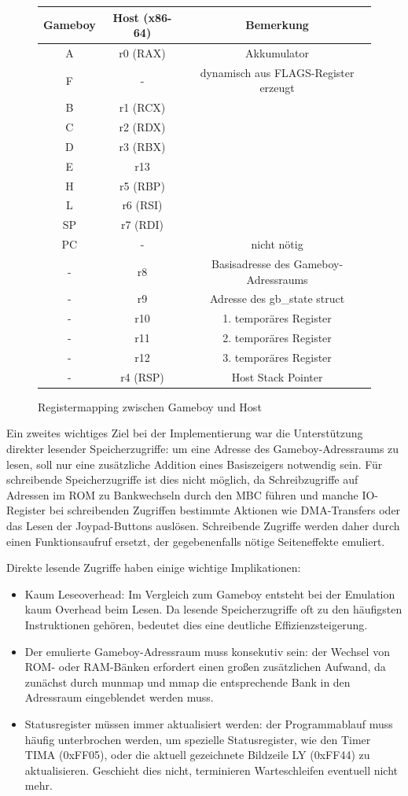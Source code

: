 \documentclass[a4paper]{scrartcl}
\begin{document}
\begin{figure}[htbp]
\centering
\begin{tabular}{c|c|c}
Gameboy&Host (x86-64)&Bemerkung \\
\hline
A&r0 (RAX)&Akkumulator \\
F&-&dynamisch aus FLAGS-Register erzeugt \\
B&r1 (RCX)& \\
C&r2 (RDX)&\\
D&r3 (RBX)& \\
E&r13& \\
H&r5 (RBP)&\\
L&r6 (RSI)& \\
SP&r7 (RDI)& \\
PC&-&nicht nötig \\
-&r8&Basisadresse des Gameboy-Adressraums \\
-&r9&Adresse des gb\_state struct \\
-&r10&1. temporäres Register \\
-&r11&2. temporäres Register \\
-&r12&3. temporäres Register \\
-&r4 (RSP)&Host Stack Pointer
\end{tabular}
\caption{Registermapping zwischen Gameboy und Host}
\label{tab:register}
\end{figure}

Ein zweites wichtiges Ziel bei der Implementierung war die Unterstützung direkter lesender Speicherzugriffe: um eine Adresse des Gameboy-Adressraums zu lesen, soll nur eine zusätzliche Addition eines Basiszeigers notwendig sein. Für schreibende Speicherzugriffe ist dies nicht möglich, da Schreibzugriffe auf Adressen im ROM zu Bankwechseln durch den MBC führen und manche IO-Register bei schreibenden Zugriffen bestimmte Aktionen wie DMA-Transfers oder das Lesen der Joypad-Buttons auslösen. Schreibende Zugriffe werden daher durch einen Funktionsaufruf ersetzt, der gegebenenfalls nötige Seiteneffekte emuliert.

Direkte lesende Zugriffe haben einige wichtige Implikationen:
\begin{itemize}
\item Kaum Leseoverhead: Im Vergleich zum Gameboy entsteht bei der Emulation kaum Overhead beim Lesen. Da lesende Speicherzugriffe oft zu den häufigsten Instruktionen gehören, bedeutet dies eine deutliche Effizienzsteigerung.
\item Der emulierte Gameboy-Adressraum muss konsekutiv sein: der Wechsel von ROM- oder RAM-Bänken erfordert einen großen zusätzlichen Aufwand, da zunächst durch munmap und mmap die entsprechende Bank in den Adressraum eingeblendet werden muss.
\item Statusregister müssen immer aktualisiert werden: der Programmablauf muss häufig unterbrochen werden, um spezielle Statusregister, wie den Timer TIMA (0xFF05), oder die aktuell gezeichnete Bildzeile LY (0xFF44) zu aktualisieren. Geschieht dies nicht, terminieren Warteschleifen eventuell nicht mehr.
\end{itemize}
\end{document}
